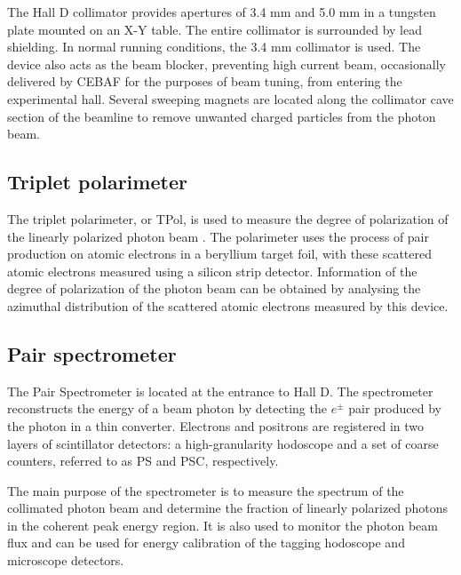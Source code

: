 The Hall D collimator provides apertures of 3.4 mm and 5.0 mm in a tungsten plate mounted on an X-Y table.
The entire collimator is surrounded by lead shielding.
In normal \GX{} running conditions, the 3.4 mm collimator is used.
The device also acts as the beam blocker, preventing high current beam, occasionally delivered by CEBAF for the purposes of beam tuning, from entering the experimental hall.
Several sweeping magnets are located along the collimator cave section of the beamline to remove unwanted charged particles from the photon beam.

\subsection{Triplet polarimeter \label{sec:tpol}}
The triplet polarimeter, or TPol, is used to measure the degree of polarization of the linearly polarized photon beam \cite{DUGGER2017115}.
The polarimeter uses the process of pair production on atomic electrons in a beryllium target foil, with these scattered atomic electrons measured using a silicon strip detector.
Information of the degree of polarization of the photon beam can be obtained by analysing the azimuthal distribution of the scattered atomic electrons measured by this device.

\subsection{Pair spectrometer \label{sec:ps}}

The Pair Spectrometer \cite{BARBOSA2015376} is located at the entrance to Hall D.
The spectrometer reconstructs the
energy of a beam photon by detecting the $e^\pm$ pair produced by the
photon in a thin converter. 
Electrons and positrons are registered in two layers of scintillator
detectors: a high-granularity hodoscope and a set of coarse counters,
referred to as PS and PSC, respectively.

The main purpose of the spectrometer is to measure the spectrum of the
collimated photon beam and determine the fraction of linearly polarized
photons in the coherent peak energy region.
It is also used to monitor the photon beam flux and can be used for 
energy calibration of the tagging hodoscope and microscope detectors.


